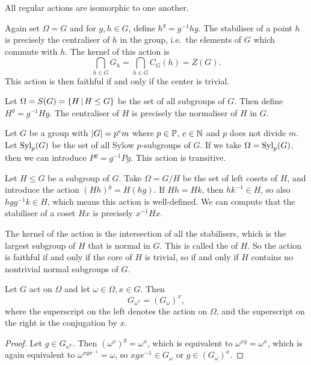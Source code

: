 \begin{remark}
  All regular actions are isomorphic to one another.
\end{remark}

\begin{example}
  Again set $\Omega = G$ and for $g, h \in G$, define $h^g = g^{-1} h g$.
  The stabiliser of a point $h$ is precisely the centraliser of $h$ in the
  group, i.e.~the elements of $G$ which commute with $h$.
  The kernel of this action is
  \[
	\bigcap_{h \in G} G_h = \bigcap_{h \in G} C_G(h) = Z(G).
  \]
  This action is then faithful if and only if the center is trivial.
\end{example}

\begin{example}
  Let $\Omega = S(G) = \{ H \,|\, H \le G \}$ be the set of all subgroups of
  $G$.
  Then define $H^g = g^{-1} H g$.
  The centraliser of $H$ is precisely the normaliser of $H$ in $G$.
\end{example}

\begin{example}
  Let $G$ be a group with $\left| G \right| = p^e m$ where $p \in \mathbb{P}$, $e \in \mathbb{N}$ and
  $p$ does not divide $m$.
  Let $\operatorname{Syl}_p(G)$ be the set of all Sylow $p$-subgroups of $G$.
  If we take $\Omega = \operatorname{Syl}_p(G)$, then we can introduce $P^g = g^{-1} P g$.
  This action is transitive.
\end{example}

\begin{example}
  Let $H \le G$ be a subgroup of $G$.
  Take $\Omega = G / H$ be the set of left cosets of $H$, and introduce the
  action $(Hh)^g = H(hg)$.
  If $Hh = Hk$, then $hk^{-1} \in H$, so also $hgg^{-1}k \in H$, which means
  this action is well-defined.
  We can compute that the stabiliser of a coset $H x$ is precisely $x^{-1} H x$.

  The kernel of the action is the intersection of all the stabilisers, which is
  the largest subgroup of $H$ that is normal in $G$.
  This is called the  of $H$.
  So the action is faithful if and only if the core of $H$ is trivial, so if and
  only if $H$ contains no nontrivial normal subgroups of $G$.
\end{example}

\begin{lemma}
  Let $G$ act on $\Omega$ and let $\omega \in \Omega, x \in G$.
  Then
  \[
	G_{\omega^x} = (G_\omega)^x,
  \]
  where the superscript on the left denotes the action on $\Omega$, and the
  superscript on the right is the conjugation by $x$.
\end{lemma}

\begin{proof}
  Let $g \in G_{\omega^x}$.
  Then $(\omega^x)^g = \omega^x$, which is equivalent to $\omega^{xg} =
  \omega^x$, which is again equivalent to $\omega^{x g x^{-1}} = \omega$, so $xg
  x^{-1} \in G_\omega$ or $g \in (G_\omega)^x$.
\end{proof}

